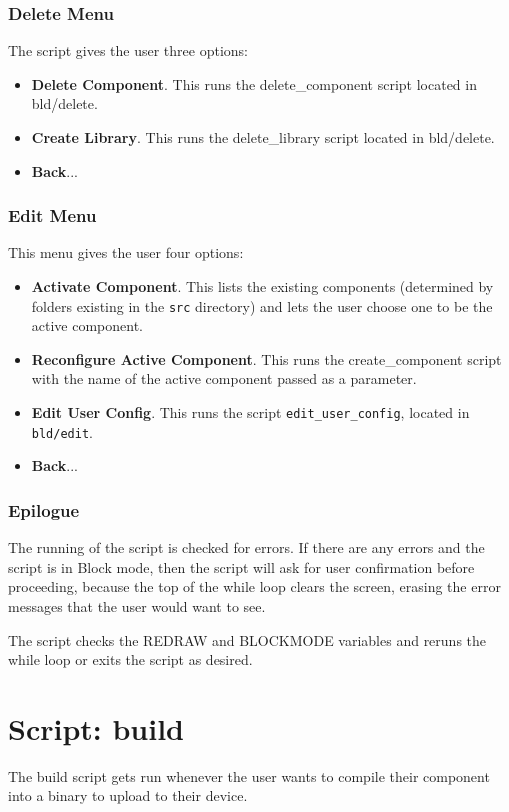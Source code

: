 \documentclass[a4paper, oneside, 11pt, titlepage, onecolumn, openright]{report}
\begin{document}
\subsubsection{Delete Menu}
			\label{sss:VFstartDeleteMenu}
			The script gives the user three options:
\begin{itemize}
\item \textbf{Delete Component}. This runs the delete\_component script located in bld/delete.
\item \textbf{Create Library}. This runs the delete\_library script located in bld/delete.
\item \textbf{Back}...
\end{itemize}			


\subsubsection{Edit Menu}
			\label{sss:VFstartEditMenu}
			This menu gives the user four options:
\begin{itemize}
\item \textbf{Activate Component}. This lists the existing components (determined by folders existing in the \texttt{src} directory) and lets the user choose one to be the active component.
\item \textbf{Reconfigure Active Component}. This runs the create\_component script with the name of the active component passed as a parameter.
\item \textbf{Edit User Config}. This runs the script \texttt{edit\_user\_config}, located in \texttt{bld/edit}. 
\item \textbf{Back}...
\end{itemize}					

\subsubsection{Epilogue}
			\label{sss:VFstartEpilogue}
			The running of the script is checked for errors. If there are any errors and the script is in Block mode, then the script will ask for user confirmation before proceeding, because the top of the while loop clears the screen, erasing the error messages that the user would want to see.
			
			The script checks the REDRAW and BLOCKMODE variables and reruns the while loop or exits the script as desired.
			
\section{Script: build}
			\label{s:build}
			The build script gets run whenever the user wants to compile their component into a binary to upload to their device.
			
\end{document}
